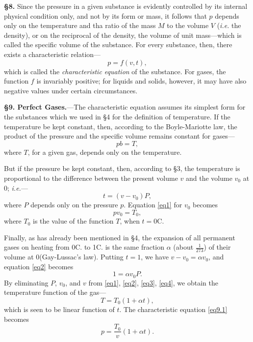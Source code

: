 \documentclass[oneside,12pt]{book}
\begin{document}
\textbf{\S 8.} Since the pressure in a given substance is evidently controlled by its internal physical condition only, and not by its form or mass, it follows that $p$ depends only on the temperature and tha ratio of the mass $M$ to the volume $V$ (\textit{i.e.} the density), or on the reciprocal of the density, the volume of unit mass---which is called the specific volume of the substance. For every substance, then, there exists a characteristic relation---
$$p=f(v,t),$$
which is called the \textit{characteristic equation} of the substance. For gases, the function $f$ is invariably positive; for liquids and solids, however, it may have also negative values under certain circumstances. \par 

\setcounter{equation}{0}
\textbf{\S 9. Perfect Gases.}---The characteristic equation assumes its simplest form for the substances which we used in \S 4 for the definition of temperature. If the temperature be kept constant, then, according to the Boyle-Mariotte law, the product of the pressure and the specific volume remains constant for gases---
\begin{equation}
    pb=T,
    \label{eq1}
\end{equation}
where $T$, for a given gas, depends only on the temperature. \par 

But if the pressure be kept constant, then, according to \S 3, the temperature is proportional to the difference between the present volume $v$ and the volume $v_0$ at 0\textdegree; \textit{i.e.}---
\begin{equation}
    t=(v-v_0)P,
    \label{eq2}
\end{equation}
where $P$ depends only on the pressure $p$. Equation \eqref{eq1} for $v_0$ becomes 
\begin{equation}
    pv_0=T_0,
    \label{eq3}
\end{equation}
where $T_0$ is the value of the function $T$, when $t=0$\textdegree C. \par 

Finally, as has already been mentioned in \S 4, the expansion of all permanent gases on heating from 0\textdegree C. to 1\textdegree C. is the same fraction $\alpha$ (about $\frac{1}{273}$) of their volume at 0\textdegree (Gay-Lussac's law). Putting $t=1$, we have $v-v_0=\alpha v_0$, and equation \eqref{eq2} becomes 
\begin{equation}
    1=\alpha v_0P. 
    \label{eq4}
\end{equation}
By eliminating $P$, $v_0$, and $v$ from \eqref{eq1}, \eqref{eq2}, \eqref{eq3}, \eqref{eq4}, we obtain the temperature function of the gas---
$$T=T_0(1+\alpha t),$$
which is seen to be linear function of $t$. The characteristic equation \eqref{eq9.1} becomes 
$$p=\frac{T_0}{v}(1+\alpha t).$$ \par 
\end{document}
